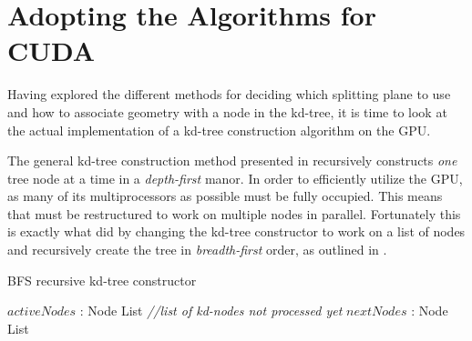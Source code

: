 



\section{Adopting the Algorithms for CUDA}\label{sec:kdTreeImpl}


Having explored the different methods for deciding which splitting plane to use
and how to associate geometry with a node in the kd-tree, it is time to look at
the actual implementation of a kd-tree construction algorithm on the GPU.

The general kd-tree construction method presented in 
recursively constructs \textit{one} tree node at a time in a
\textit{depth-first} manor. In order to efficiently utilize the GPU, as many of
its multiprocessors as possible must be fully occupied. This means that
 must be restructured to work on multiple nodes in
parallel. Fortunately this is exactly what \zhou{} did by changing the kd-tree
constructor to work on a list of nodes and recursively create the tree in
\textit{breadth-first} order, as outlined in .

\begin{algorithm}
  \caption{BFS recursive kd-tree constructor}
  \label{alg:bfsKDTreeCreator}
  \begin{algorithmic}
              {$activeNodes$ : Node List  \textit{\color{gray}//list of kd-nodes not processed yet}}
              {$nextNodes$ : Node List}
              {
                 \ELSE
                 \ENDIF
               \ENDFOR}
  \end{algorithmic}
\end{algorithm}


